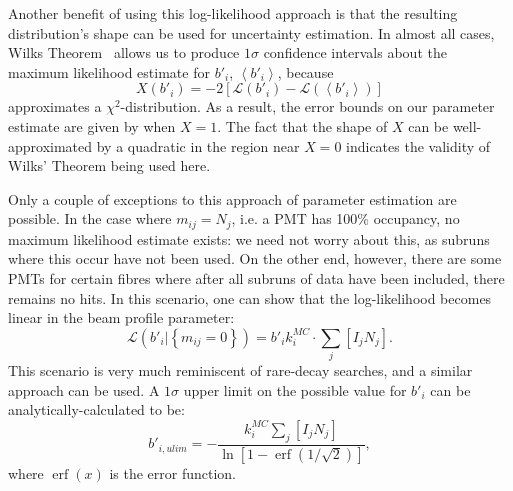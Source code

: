 Another benefit of using this log-likelihood approach is that the resulting distribution's shape can be used for uncertainty estimation. In almost all cases, Wilks Theorem~\cite{wilks_large-sample_1938} allows us to produce $1 \sigma$ confidence intervals about the maximum likelihood estimate for $b'_{i}$, $\left<b'_{i}\right>$, because $$X(b'_{i}) = -2\left[\mathcal{L}\left(b'_{i}\right) - \mathcal{L}\left(\left<b'_{i}\right>\right)\right]$$ approximates a $\chi^2$-distribution. As a result, the error bounds on our parameter estimate are given by when $X = 1$. The fact that the shape of $X$ can be well-approximated by a quadratic in the region near $X = 0$ indicates the validity of Wilks' Theorem being used here.

Only a couple of exceptions to this approach of parameter estimation are possible. In the case where $m_{ij} = N_{j}$, i.e. a PMT has 100\% occupancy, no maximum likelihood estimate exists: we need not worry about this, as subruns where this occur have not been used. On the other end, however, there are some PMTs for certain fibres where after all subruns of data have been included, there remains no hits. In this scenario, one can show that the log-likelihood becomes linear in the beam profile parameter:
\begin{equation}
    \mathcal{L}\left(b'_{i}|\left\{m_{ij}=0\right\}\right) = b'_{i}k_{i}^{MC}\cdot\sum_{j}\left[I_{j}N_{j}\right].
\end{equation}
This scenario is very much reminiscent of rare-decay searches, and a similar approach can be used. A $1 \sigma$ upper limit on the possible value for $b'_{i}$ can be analytically-calculated to be:
\begin{equation}
    b'_{i,ulim} = -\frac{k_{i}^{MC}\sum_{j}\left[I_{j}N_{j}\right]}{\ln\left[1 - \operatorname{erf}\left(1/\sqrt{2}\right)\right]},
\end{equation}
where $\operatorname{erf}(x)$ is the error function.

